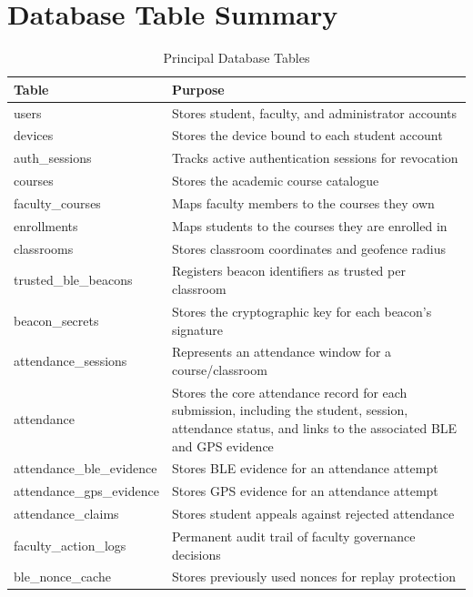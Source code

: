 \documentclass[12pt, a4paper, oneside]{report}
\begin{document}
\chapter{Database Table Summary}
\label{app:db-tables}

\begin{table}[htbp]
\centering
\caption{Principal Database Tables}
\label{tab:db-tables}
\begin{tabularx}{\textwidth}{|l|X|}
\hline
\textbf{Table} & \textbf{Purpose} \\
\hline
users & Stores student, faculty, and administrator accounts \\
\hline
devices & Stores the device bound to each student account \\
\hline
auth\_sessions & Tracks active authentication sessions for revocation \\
\hline
courses & Stores the academic course catalogue \\
\hline
faculty\_courses & Maps faculty members to the courses they own \\
\hline
enrollments & Maps students to the courses they are enrolled in \\
\hline
classrooms & Stores classroom coordinates and geofence radius \\
\hline
trusted\_ble\_beacons & Registers beacon identifiers as trusted per classroom \\
\hline
beacon\_secrets & Stores the cryptographic key for each beacon's signature \\
\hline
attendance\_sessions & Represents an attendance window for a course/classroom \\
\hline
attendance & Stores the core attendance record for each submission, including the student, session, attendance status, and links to the associated BLE and GPS evidence \\
\hline
attendance\_ble\_evidence & Stores BLE evidence for an attendance attempt \\
\hline
attendance\_gps\_evidence & Stores GPS evidence for an attendance attempt \\
\hline
attendance\_claims & Stores student appeals against rejected attendance \\
\hline
faculty\_action\_logs & Permanent audit trail of faculty governance decisions \\
\hline
ble\_nonce\_cache & Stores previously used nonces for replay protection \\
\hline
\end{tabularx}
\end{table}
\end{document}
